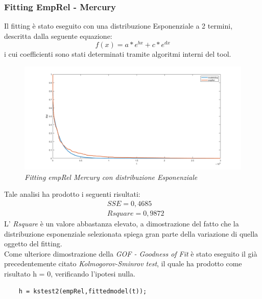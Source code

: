 \subsubsection{Fitting EmpRel - Mercury}
Il fitting è stato eseguito con una distribuzione Esponenziale a 2 termini, descritta dalla seguente equazione:
\begin{equation*}
	f(x) = a*e^{bx}+c*e^{dx}
\end{equation*}
i cui coefficienti sono stati determinati tramite algoritmi interni del tool.
\begin{figure}[H]
	\centering
	\includegraphics[width=\textwidth]{img/hw6/FittingM.png}
	\caption{\textit{Fitting empRel Mercury con distribuzione Esponenziale}}
\end{figure}
Tale analisi ha prodotto i seguenti risultati:
\begin{equation*}
	\begin{split}
		&SSE = 0,4685\\
		&Rsquare = 0,9872
	\end{split}
\end{equation*}
L' \textit{Rsquare} è un valore abbastanza elevato, a dimostrazione del fatto che la distribuzione esponenziale selezionata spiega gran parte della variazione di quella oggetto del fitting.
\\Come ulteriore dimostrazione della \textit{GOF - Goodness of Fit} è stato eseguito il già precedentemente citato \textit{Kolmogorov-Sminrov test}, il quale ha prodotto come risultato h = 0, verificando l'ipotesi nulla.
\begin{verbatim}
	h = kstest2(empRel,fittedmodel(t));
\end{verbatim}
